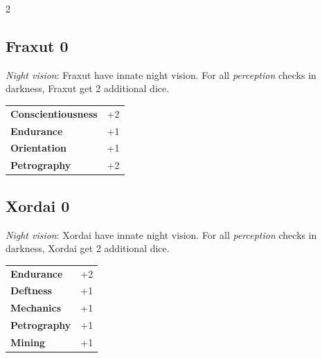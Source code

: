 \begin{multicols}{2}
\begin{tcolorbox}
\end{tcolorbox}

\begin{tcolorbox}
    \subsection*{Fraxut \hfill \small{0 }}
    \tcblower
\textit{Night vision}: Fraxut have innate night vision. For all \textit{perception} checks in darkness, Fraxut get 2 additional dice.


\vspace{3mm}

\begin{tabular}{@{}ll@{}}
    \textbf{Conscientiousness} & +2\\
    \textbf{Endurance} & +1\\
    \textbf{Orientation} & +1\\
    \textbf{Petrography} & +2\\
\end{tabular}


\end{tcolorbox}

\begin{tcolorbox}
    \subsection*{Xordai \hfill \small{0 }}
    \tcblower
\textit{Night vision}: Xordai have innate night vision. For all \textit{perception} checks in darkness, Xordai get 2 additional dice.


\vspace{3mm}

\begin{tabular}{@{}ll@{}}
    \textbf{Endurance} & +2\\
    \textbf{Deftness} & +1\\
    \textbf{Mechanics} & +1\\
    \textbf{Petrography} & +1\\
    \textbf{Mining} & +1\\
\end{tabular}



\end{tcolorbox}
\end{multicols}
